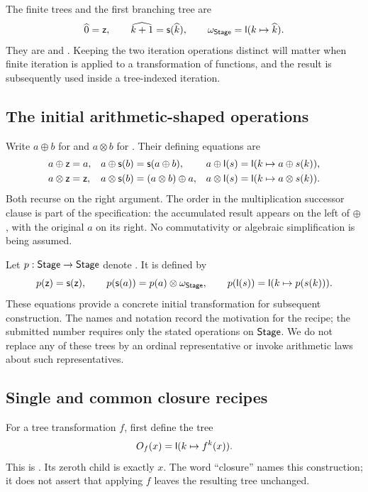 The finite trees and the first branching tree are
\[
 \widehat 0=\mathsf z,\qquad \widehat{k+1}=\mathsf s(\widehat k),
 \qquad \omega_{\mathsf{Stage}}=\mathsf l(k\mapsto\widehat k).
\]
They are  and . Keeping the two iteration
operations distinct will matter when finite iteration is applied to a
transformation of functions, and the result is subsequently used inside
a tree-indexed iteration.

\subsection{The initial arithmetic-shaped operations}

Write \(a\oplus b\) for  and \(a\otimes b\)
for . Their defining equations are
\begin{align*}
 a\oplus\mathsf z&=a,
 &a\oplus\mathsf s(b)&=\mathsf s(a\oplus b),
 &a\oplus\mathsf l(s)&=\mathsf l(k\mapsto a\oplus s(k)),\\
 a\otimes\mathsf z&=\mathsf z,
 &a\otimes\mathsf s(b)&=(a\otimes b)\oplus a,
 &a\otimes\mathsf l(s)&=\mathsf l(k\mapsto a\otimes s(k)).
\end{align*}
Both recurse on the right argument. The order in the multiplication
successor clause is part of the specification: the accumulated result
appears on the left of \(\oplus\), with the original \(a\) on its right.
No commutativity or algebraic simplification is being assumed.

Let \(p:\mathsf{Stage}\to\mathsf{Stage}\) denote . It is defined by
\[
 p(\mathsf z)=\mathsf s(\mathsf z),\qquad
 p(\mathsf s(a))=p(a)\otimes\omega_{\mathsf{Stage}},\qquad
 p(\mathsf l(s))=\mathsf l(k\mapsto p(s(k))).
\]
These equations provide a concrete initial transformation for subsequent
construction. The names and notation record the motivation for the
recipe; the submitted number requires only the stated operations on
\(\mathsf{Stage}\). We do not replace any of these trees by an ordinal representative
or invoke arithmetic laws about such representatives.

\subsection{Single and common closure recipes}

For a tree transformation \(f\), first define the tree
\[
 O_f(x)=\mathsf l(k\mapsto f^k(x)).
\]
This is . Its zeroth child is exactly \(x\).
The word ``closure'' names this construction; it does not assert that
applying \(f\) leaves the resulting tree unchanged.

